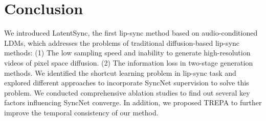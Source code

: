 \section{Conclusion}
We introduced LatentSync, the first lip-sync method based on audio-conditioned LDMs, which addresses the problems of traditional diffusion-based lip-sync methods: (1) The low sampling speed and inability to generate high-resolution videos of pixel space diffusion. (2) The information loss in two-stage generation methods. We identified the shortcut learning problem in lip-sync task and explored different approaches to incorporate SyncNet supervision to solve this problem. We conducted comprehensive ablation studies to find out several key factors influencing SyncNet converge. In addition, we proposed TREPA to further improve the temporal consistency of our method.